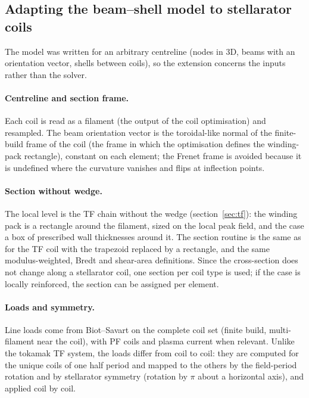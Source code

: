 \subsection{Adapting the beam--shell model to stellarator coils}
The model was written for an arbitrary centreline (nodes in 3D, beams
with an orientation vector, shells between coils), so the extension
concerns the inputs rather than the solver.

\paragraph{Centreline and section frame.} Each coil is read as a filament
(the output of the coil optimisation) and resampled. The beam orientation
vector is the toroidal-like normal of the finite-build frame of the coil
(the frame in which the optimisation defines the winding-pack
rectangle), constant on each element; the Frenet frame is avoided because
it is undefined where the curvature vanishes and flips at inflection
points.

\paragraph{Section without wedge.} The local level is the TF chain without
the wedge (section~\ref{sec:tf}): the winding pack is a rectangle around
the filament, sized on the local peak field, and the case a box of
prescribed wall thicknesses around it. The section routine is the same
as for the TF coil with the trapezoid replaced by a rectangle, and the
same modulus-weighted, Bredt and shear-area definitions. Since the
cross-section does not change along a stellarator coil, one section per
coil type is used; if the case is locally reinforced, the section can be
assigned per element.

\paragraph{Loads and symmetry.} Line loads come from Biot--Savart on the
complete coil set (finite build, multi-filament near the coil), with PF
coils and plasma current when relevant. Unlike the tokamak TF system, the
loads differ from coil to coil: they are computed for the unique coils of
one half period and mapped to the others by the field-period rotation and
by stellarator symmetry (rotation by $\pi$ about a horizontal axis), and
applied coil by coil.

